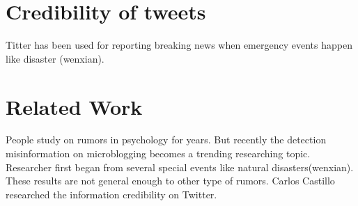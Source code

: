 \section{Credibility of tweets } %
Titter has been used for reporting breaking news when emergency events happen like disaster (wenxian). 


\section{Related Work } %
People study on rumors in psychology for years\cite{allport1947psychology}.
But recently the detection misinformation on microblogging becomes a trending researching topic. Researcher first began from several special events like natural disasters(wenxian). These results are not general enough to other type of rumors. Carlos Castillo researched the information credibility on Twitter. 



